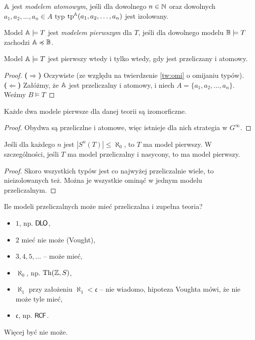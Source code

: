 \documentclass{article}
\begin{document}
\begin{df}
	$\mathbb{A}$ jest \textit{modelem atomowym}, jeśli dla dowolnego $n \in \mathbb{N}$ oraz dowolnych $a_1, a_2, \ldots, a_n \in A$ typ $\text{tp}^{\mathbb{A}}(a_1, a_2, \ldots, a_n)$ jest izolowany.
\end{df}
\begin{df}
	Model $\mathbb{A} \models T$ jest \textit{modelem pierwszym} dla $T$,
	jeśli dla dowolnego modelu $\mathbb{B} \models T$ zachodzi $\mathbb{A} \preccurlyeq \mathbb{B}$.
\end{df}
\begin{stw}
	 Model $\mathbb{A} \models T$ jest pierwszy wtedy i tylko wtedy, gdy jest przeliczany i atomowy.
\end{stw}
\begin{proof}
	\textbf{($\Rightarrow$)} Oczywiste (ze względu na twierdzenie \ref{tw:omi} o omijaniu typów).
	\\\textbf{($\Leftarrow$)}
	Załóżmy, że $\mathbb{A}$ jest przeliczalny i atomowy, i niech $A = \{a_1, a_2, \ldots, a_n\}$.
	Weźmy $B \models T$
\end{proof}
\begin{wn}
	 Każde dwa modele pierwsze dla danej teorii są izomorficzne.
\end{wn}
\begin{proof}
	Obydwa są przeliczlne i atomowe, więc istnieje dla nich strategia w $G^{\infty}$.
\end{proof}

\begin{wn}
	Jeśli dla każdego $n$ jest $|S^n(T)| \leq \aleph_0$, to $T$ ma model pierwszy.
	W szczególności, jeśli $T$ ma model przeliczalny i nasycony, to ma model pierwszy.
\end{wn}
\begin{proof}
	 Skoro wszystkich typów jest co najwyżej przeliczalnie wiele, to nieizolowanych też.
	 Można je wszystkie ominąć w jednym modelu przeliczalnym.
\end{proof}

Ile modeli przeliczalnych może mieć przeliczalna i zupełna teoria?
\begin{itemize}
	\item $1$, np. $\mathsf{D \mkern-1.5mu L \mkern-1.8mu O}$,
	\item $2$ mieć nie może (Vought),
	\item $3, 4, 5, \ldots$ -- może mieć,
	\item $\aleph_0$, np. $\text{Th}(\mathbb{Z}, S)$,
	\item $\aleph_1$ przy założeniu $\aleph_1 <  \mathfrak{c}$ -- nie wiadomo, hipoteza Voughta mówi, że nie może tyle mieć,
	\item $ \mathfrak{c}$, np. $\mathsf{R \mkern-1.7mu C \mkern-1.4mu F}$.
\end{itemize}
Więcej być nie może.
\end{document}
